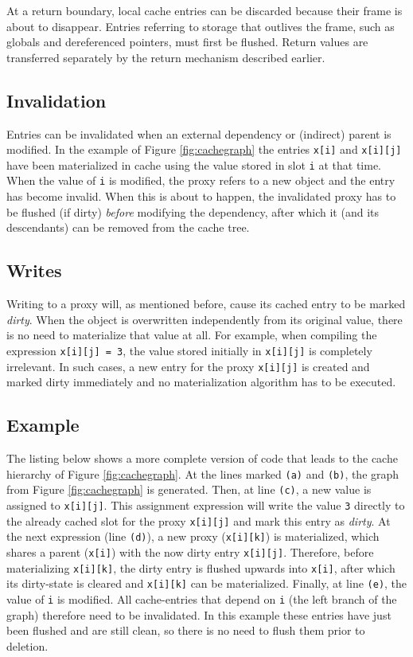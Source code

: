 At a return boundary, local cache entries can be discarded because their frame is about to disappear. Entries referring to storage that outlives the frame, such as globals and dereferenced pointers, must first be flushed. Return values are transferred separately by the return mechanism described earlier.

\subsection{Invalidation} Entries can be invalidated when an external dependency or (indirect) parent is modified. In the example of Figure \ref{fig:cachegraph} the entries \texttt{x[i]} and \texttt{x[i][j]} have been materialized in cache using the value stored in slot \texttt{i} at that time. When the value of \texttt{i} is modified, the proxy refers to a new object and the entry has become invalid. When this is about to happen, the invalidated proxy has to be flushed (if dirty) \emph{before} modifying the dependency, after which it (and its descendants) can be removed from the cache tree.

\subsection{Writes}
Writing to a proxy will, as mentioned before, cause its cached entry to be marked \emph{dirty}. When the object is overwritten independently from its original value, there is no need to materialize that value at all. For example, when compiling the expression \texttt{x[i][j] = 3}, the value stored initially in \texttt{x[i][j]} is completely irrelevant. In such cases, a new entry for the proxy \texttt{x[i][j]} is created and marked dirty immediately and no materialization algorithm has to be executed.

\subsection{Example} The listing below shows a more complete version of code that leads to the cache hierarchy of Figure \ref{fig:cachegraph}. At the lines marked \texttt{(a)} and \texttt{(b)}, the graph from Figure \ref{fig:cachegraph} is generated. Then, at line \texttt{(c)}, a new value is assigned to \texttt{x[i][j]}. This assignment expression will write the value \texttt{3} directly to the already cached slot for the proxy \texttt{x[i][j]} and mark this entry as \emph{dirty}. At the next expression (line \texttt{(d)}), a new proxy (\texttt{x[i][k]}) is materialized, which shares a parent (\texttt{x[i]}) with the now dirty entry \texttt{x[i][j]}. Therefore, before materializing \texttt{x[i][k]}, the dirty entry is flushed upwards into \texttt{x[i]}, after which its dirty-state is cleared and \texttt{x[i][k]} can be materialized. Finally, at line \texttt{(e)}, the value of \texttt{i} is modified. All cache-entries that depend on \texttt{i} (the left branch of the graph) therefore need to be invalidated. In this example these entries have just been flushed and are still clean, so there is no need to flush them prior to deletion.

